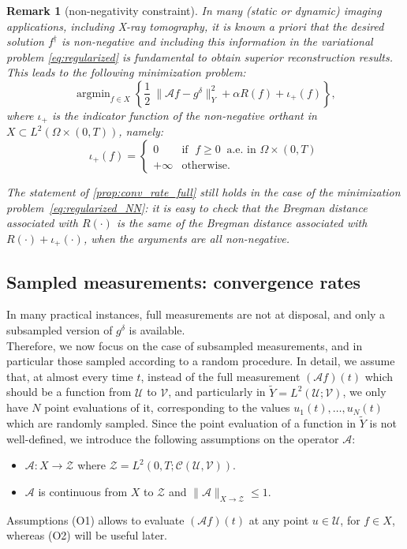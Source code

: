 \documentclass[11pt,a4paper]{article}
\numberwithin{equation}{section}
\newtheorem{remark}{Remark}[section]
\DeclareMathOperator*{\argmin}{argmin}
\newcommand{\cA}{\mathscr{A}}
\def\gd{{g}^{\delta}}
\begin{document}
\begin{remark}[non-negativity constraint]
In many (static or dynamic) imaging applications, including X-ray tomography, it is known \textit{a priori} that the desired solution $f^\dag$ is non-negative and including this information in the variational problem  \eqref{eq:regularized} is fundamental to obtain superior reconstruction results. This leads to the following minimization problem:
\begin{equation}\label{eq:regularized_NN}
\argmin_{f \in X} \left\{
\frac{1}{2} \ \| \cA f 
    - g^{\delta}\|^2_{Y} + \alpha R(f)+ \iota_+(f)
\right\},
\end{equation}
where $\iota_+$ is the indicator function of the non-negative orthant in $X \subset L^2(\Omega \times(0,T))$, namely:
\[
    \iota_+(f) = \begin{cases}
       0 &\text{if }\;  f \geq 0 \ \text{ a.e. in }\Omega \times (0,T) \\ 
       +\infty &\text{otherwise}.
    \end{cases}
    \]

The statement of \cref{prop:conv_rate_full} still holds in the case of the minimization problem~\eqref{eq:regularized_NN}: it is easy to check that the Bregman distance associated with $R(\cdot)$ is the same of the Bregman distance associated with $R(\cdot)+\iota_+(\cdot)$, when the arguments are all non-negative.
\end{remark}


\subsection{Sampled measurements: convergence rates}
\label{ssec:sampled}

In many practical instances, full measurements are not at disposal, and only a subsampled version of $\gd$ is available. \\
Therefore, we now focus on the case of subsampled measurements, and in particular those sampled according to a random procedure.
In detail, we assume that, at almost every time $t$, instead of the full measurement $(\cA f)(t)$ which should be a function from $\mathcal{U}$ to $\mathcal{V}$, and particularly in $\tilde{Y}=L^2(\mathcal{U};\mathcal{V})$, we only have $N$ point evaluations of it, 
corresponding to the values $u_1(t),\ldots,u_N(t)$ which are randomly sampled.
Since the point evaluation of a function in $\tilde{Y}$ 
is not well-defined, we introduce the following assumptions on the operator $\cA$:
\begin{itemize}
    \item[(O1)] $\cA: X \rightarrow \mathcal{Z}$ where $\mathcal{Z} = L^2(0,T; \mathcal{C}(\mathcal{U},\mathcal{V}))$. 
    \item[(O2)] $\cA$ is continuous from $X$ to $\mathcal{Z}$ and $\| \cA\|_{X \rightarrow \mathcal{Z}} \leq 1$.
\end{itemize}
Assumptions (O1) allows to evaluate $(\cA f)(t)$ at any point $u \in\mathcal{U}$, for $f \in X$, whereas (O2) will be useful later.
\end{document}
